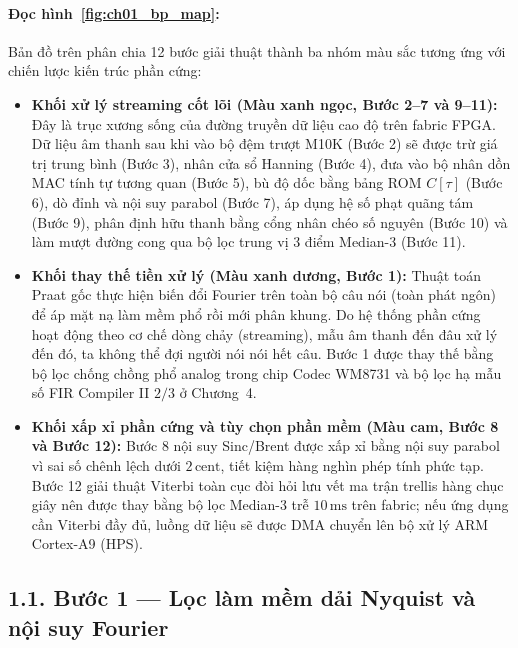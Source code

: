 \paragraph{Đọc hình~\ref{fig:ch01_bp_map}:}
Bản đồ trên phân chia 12 bước giải thuật thành ba nhóm màu sắc tương ứng với chiến lược kiến trúc phần cứng:
\begin{itemize}[leftmargin=1.4em]
    \item \textbf{Khối xử lý streaming cốt lõi (Màu xanh ngọc, Bước 2--7 và 9--11):} Đây là trục xương sống của đường truyền dữ liệu cao độ trên fabric FPGA. Dữ liệu âm thanh sau khi vào bộ đệm trượt M10K (Bước 2) sẽ được trừ giá trị trung bình (Bước 3), nhân cửa sổ Hanning (Bước 4), đưa vào bộ nhân dồn MAC tính tự tương quan (Bước 5), bù độ dốc bằng bảng ROM $C[\tau]$ (Bước 6), dò đỉnh và nội suy parabol (Bước 7), áp dụng hệ số phạt quãng tám (Bước 9), phân định hữu thanh bằng cổng nhân chéo số nguyên (Bước 10) và làm mượt đường cong qua bộ lọc trung vị 3 điểm Median-3 (Bước 11).
    \item \textbf{Khối thay thế tiền xử lý (Màu xanh dương, Bước 1):} Thuật toán Praat gốc thực hiện biến đổi Fourier trên toàn bộ câu nói (toàn phát ngôn) để áp mặt nạ làm mềm phổ rồi mới phân khung. Do hệ thống phần cứng hoạt động theo cơ chế dòng chảy (streaming), mẫu âm thanh đến đâu xử lý đến đó, ta không thể đợi người nói nói hết câu. Bước 1 được thay thế bằng bộ lọc chống chồng phổ analog trong chip Codec WM8731 và bộ lọc hạ mẫu số FIR Compiler II $2/3$ ở Chương~4.
    \item \textbf{Khối xấp xỉ phần cứng và tùy chọn phần mềm (Màu cam, Bước 8 và Bước 12):} Bước 8 nội suy Sinc/Brent được xấp xỉ bằng nội suy parabol vì sai số chênh lệch dưới $2\,\text{cent}$, tiết kiệm hàng nghìn phép tính phức tạp. Bước 12 giải thuật Viterbi toàn cục đòi hỏi lưu vết ma trận trellis hàng chục giây nên được thay bằng bộ lọc Median-3 trễ $10\,\text{ms}$ trên fabric; nếu ứng dụng cần Viterbi đầy đủ, luồng dữ liệu sẽ được DMA chuyển lên bộ xử lý ARM Cortex-A9 (HPS).
\end{itemize}

\subsection*{1.1. Bước 1 --- Lọc làm mềm dải Nyquist và nội suy Fourier}

